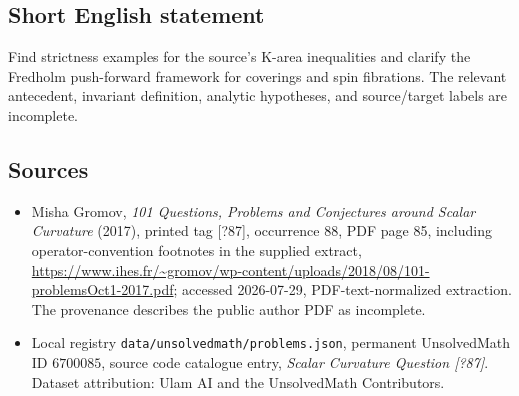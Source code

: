 \documentclass[11pt]{article}
\begin{document}
\subsection{Short English statement}
Find strictness examples for the source's K-area inequalities and clarify the Fredholm push-forward framework for coverings and spin fibrations. The relevant antecedent, invariant definition, analytic hypotheses, and source/target labels are incomplete.
\subsection{Sources}
\begin{itemize}
\item Misha Gromov, \emph{101 Questions, Problems and Conjectures around Scalar Curvature} (2017), printed tag [?87], occurrence 88, PDF page 85, including operator-convention footnotes in the supplied extract, \url{https://www.ihes.fr/~gromov/wp-content/uploads/2018/08/101-problemsOct1-2017.pdf}; accessed 2026-07-29, PDF-text-normalized extraction. The provenance describes the public author PDF as incomplete.
\item Local registry \texttt{data/unsolvedmath/problems.json}, permanent UnsolvedMath ID $6700085$, source code catalogue entry, \emph{Scalar Curvature Question [?87]}. Dataset attribution: Ulam AI and the UnsolvedMath Contributors.
\end{itemize}
\end{document}
